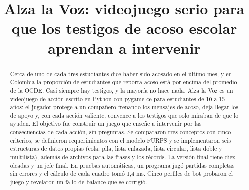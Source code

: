 \documentclass[conference]{IEEEtran}
\begin{document}
\title{Alza la Voz: videojuego serio para que los testigos de acoso escolar aprendan a intervenir}

\author{

\and {}\and {}\and {}\and {}

\and {}}

\maketitle

\begin{abstract}Cerca de uno de cada tres estudiantes dice haber sido acosado en el último mes, y en Colombia la proporción de estudiantes que reporta acoso está por encima del promedio de la OCDE. Casi siempre hay testigos, y la mayoría no hace nada. Alza la Voz es un videojuego de acción escrito en Python con pygame-ce para estudiantes de 10 a 15 años: el jugador protege a un compañero frenando los mensajes de acoso, deja llegar los de apoyo y, con cada acción valiente, convence a los testigos que solo miraban de que lo ayuden. El objetivo fue construir un juego que enseñe a intervenir por las consecuencias de cada acción, sin preguntas. Se compararon tres conceptos con cinco criterios, se definieron requerimientos con el modelo FURPS y se implementaron seis estructuras de datos propias (cola, pila, lista enlazada, lista circular, lista doble y multilista), además de archivos para las frases y los récords. La versión final tiene diez oleadas y un jefe final. En pruebas automáticas, un programa jugó partidas completas sin errores y el cálculo de cada cuadro tomó 1,4 ms. Cinco perfiles de bot probaron el juego y revelaron un fallo de balance que se corrigió.\end{abstract}
\end{document}
